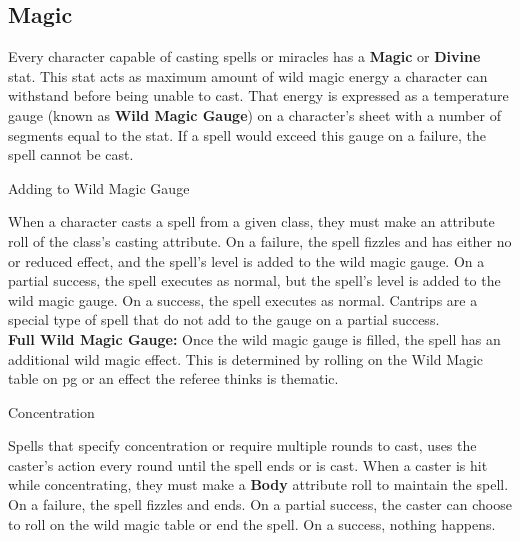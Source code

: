 \documentclass[18pt]{article}
\begin{document}
\begin{multicols}{2}
\section*{Magic}%
\label{section:GenMagicRules}
Every character capable of casting spells or miracles has a \textbf{Magic} or \textbf{Divine} stat. This stat acts as maximum amount of wild magic energy a character can withstand before being unable to cast. That energy is expressed as a temperature gauge (known as \textbf{Wild Magic Gauge}) on a character's sheet with a number of segments equal to the stat. If a spell would exceed this gauge on a failure, the spell cannot be cast.
\begin{mercHeading}
{Adding to Wild Magic Gauge}
\end{mercHeading}
When a character casts a spell from a given class, they must make an attribute roll of the class's casting attribute. On a failure, the spell fizzles and has either no or reduced effect, and the spell's level is added to the wild magic gauge. On a partial success, the spell executes as normal, but the spell's level is added to the wild magic gauge. On a success, the spell executes as normal. Cantrips are a special type of spell that do not add to the gauge on a partial success.\vspace{2pt}\\
  \textbf{Full Wild Magic Gauge:}
Once the wild magic gauge is filled, the spell has an additional wild magic effect. This is determined by rolling on the Wild Magic table on pg \pageref{table:WildMagic} or an effect the referee thinks is thematic.
\begin{mercHeading}
Concentration
\end{mercHeading}

Spells that specify concentration or require multiple rounds to cast, uses the caster's action every round until the spell ends or is cast. When a caster is hit while concentrating, they must make a \textbf{Body} attribute roll to maintain the spell. On a failure, the spell fizzles and ends. On a partial success, the caster can choose to roll on the wild magic table or end the spell. On a success, nothing happens.

\end{multicols}
\end{document}
